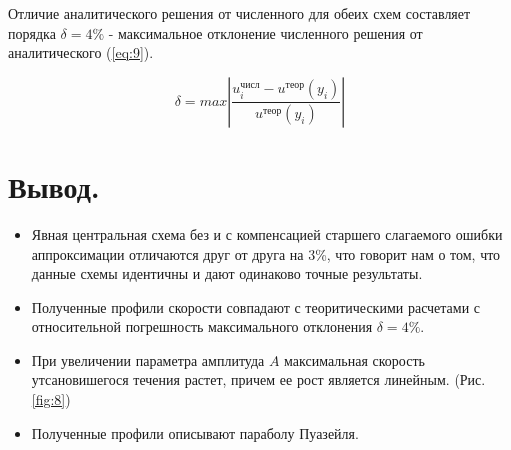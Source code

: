 Отличие аналитического решения от численного для обеих схем составляет порядка $\delta = 4\%$ - максимальное отклонение численного решения от аналитического (\ref{eq:9}).

\begin{equation}
    \delta = max\left| \frac{u_i^\text{числ}-u^\text{теор}(y_i)}{u^\text{теор}(y_i)}\right|
\label{eq:9}
\end{equation}



\section{Вывод.}
\begin{itemize}
    \item Явная центральная схема без и с компенсацией старшего слагаемого ошибки аппроксимации отличаются друг от друга на 3\%, что говорит нам о том, что данные схемы идентичны и дают одинаково точные результаты.
    \item Полученные профили скорости совпадают с теоритическими расчетами с относительной погрешность максимального отклонения $\delta = 4\%$.
    \item При увеличении параметра амплитуда $A$ максимальная скорость утсановишегося течения растет, причем ее рост является линейным. (Рис. \ref{fig:8})
    \item Полученные профили описывают параболу Пуазейля.
    
\end{itemize}